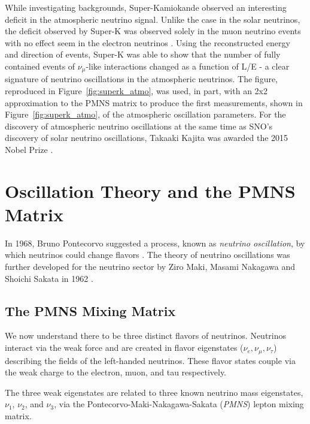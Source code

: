 While investigating backgrounds, Super-Kamiokande observed an interesting deficit in the atmospheric neutrino signal.
Unlike the case in the solar neutrinos, the deficit observed by Super-K was observed solely in the muon neutrino events with no effect seem in the electron neutrinos \cite{SuperK-Oscillations}.
Using the reconstructed energy and direction of events, Super-K was able to show that the number of fully contained events of $\nu_\mu$-like interactions changed as a function of L/E - a clear signature of neutrino oscillations in the atmospheric neutrinos.
The figure, reproduced in Figure~\ref{fig:superk_atmo}, was used, in part, with an 2x2 approximation to the PMNS matrix to produce the first measurements, shown in Figure~\ref{fig:superk_atmo}, of the atmospheric oscillation parameters.
For the discovery of atmospheric neutrino oscillations at the same time as SNO's discovery of solar neutrino oscillations, Takaaki Kajita was awarded the 2015 Nobel Prize \cite{NobelPrize:2015-Oscillations}.




\section{Oscillation Theory and the PMNS Matrix}
\label{sec:oscillation_theory}
In 1968, Bruno Pontecorvo suggested a process, known as \emph{neutrino oscillation}, by which neutrinos could change flavors \cite{Pontecorvo-Oscillations}.
The theory of neutrino oscillations was further developed for the neutrino sector by Ziro Maki, Masami Nakagawa and Shoichi Sakata in 1962 \cite{Maki-Nakagawa-Sakata}.

\subsection{The PMNS Mixing Matrix}
We now understand there to be three distinct flavors of neutrinos.
Neutrinos interact via the weak force and are created in flavor eigenstates ($\nu_e , \nu_\mu , \nu_\tau$) describing the fields of the left-handed neutrinos.
These flavor states couple via the weak charge to the electron, muon, and tau respectively.

The three weak eigenstates are related to three known neutrino mass eigenstates, $\nu_1$, $\nu_2$, and $\nu_3$, via the Pontecorvo-Maki-Nakagawa-Sakata (\emph{PMNS}) lepton mixing matrix.

